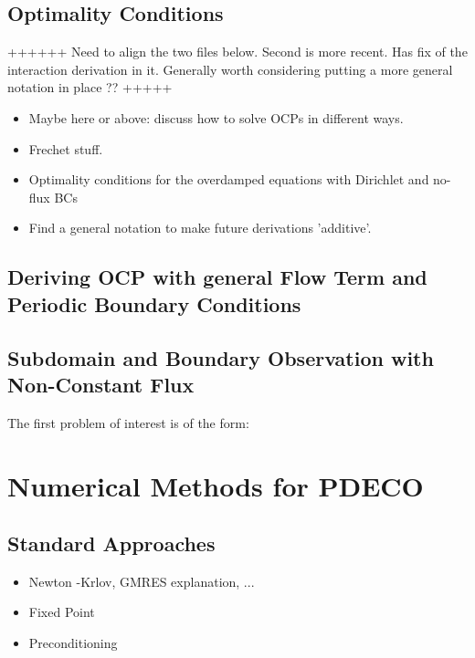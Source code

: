 \documentclass[11pt, a4paper]{article}
\theoremstyle{definition}
\begin{document}
	\subsection{Optimality Conditions}
	++++++ Need to align the two files below. Second is more recent. Has fix of the interaction derivation in it. Generally worth considering putting a more general notation in place ?? +++++
		\begin{itemize}
			\item Maybe here or above: discuss how to solve OCPs in different ways.
			\item Frechet stuff.
			\item Optimality conditions for the overdamped equations with Dirichlet and no-flux BCs
			\item Find a general notation to make future derivations 'additive'.
		\end{itemize}
	
	
	
	\subsection{Deriving OCP with general Flow Term and Periodic Boundary Conditions}
	
	
	\subsection{Subdomain and Boundary Observation with Non-Constant Flux}
	
	The first problem of interest is of the form:
	
	
		
	
	
	
	
	
	\section{Numerical Methods for PDECO}
	
	\subsection{Standard Approaches}
		\begin{itemize}
			\item Newton -Krlov, GMRES explanation, ...
			\item Fixed Point
			\item Preconditioning
		\end{itemize}
	
\end{document}

